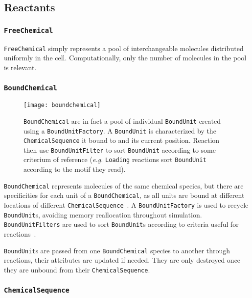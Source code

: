 
\subsection{Reactants}

\subsubsection{\texttt{FreeChemical}}

\texttt{FreeChemical} simply represents a pool of interchangeable molecules distributed uniformly in the cell.
Computationally, only the number of molecules in the pool is relevant.

\subsubsection{\texttt{BoundChemical}}

\begin{figure}[!h]
  \centering
  \texttt{[image: boundchemical]}
  \caption{
  \texttt{BoundChemical} are in fact a pool of individual \texttt{BoundUnit}
  created using a \texttt{BoundUnitFactory}.
  A \texttt{BoundUnit} is characterized by the \texttt{ChemicalSequence}
  it bound to and its current position.
  Reaction then use \texttt{BoundUnitFilter} to sort \texttt{BoundUnit}
  according to some criterium of reference
  (\textit{e.g.} \texttt{Loading} reactions sort \texttt{BoundUnit} according to the motif they read).
  }
\label{fig:det_bound_chemical}
\end{figure}

\texttt{BoundChemical} represents molecules of the same chemical species,
but there are specificities for each unit of a \texttt{BoundChemical},
as all units are bound at different locations of different
\texttt{ChemicalSequence}~.
A \texttt{BoundUnitFactory} is used to recycle \texttt{BoundUnit}s,
avoiding memory reallocation throughout simulation.
\texttt{BoundUnitFilters} are used to sort \texttt{BoundUnit}s according
to criteria useful for reactions~.

\texttt{BoundUnit}s are passed from one \texttt{BoundChemical} species to another through reactions,
their attributes are updated if needed.
They are only destroyed once they are unbound from their \texttt{ChemicalSequence}.


\subsubsection{\texttt{ChemicalSequence}}

